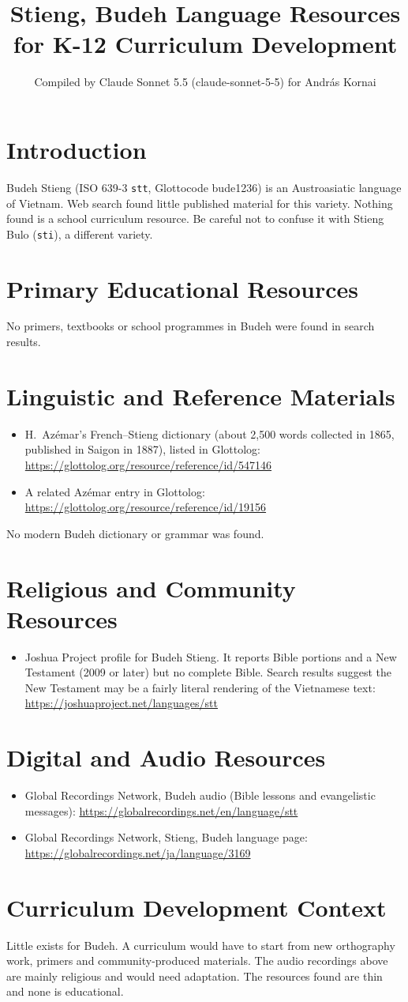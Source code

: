 \documentclass[12pt]{article}
\title{Stieng, Budeh Language Resources for K-12 Curriculum Development}
\author{Compiled by Claude Sonnet 5.5 (claude-sonnet-5-5) for Andr\'as Kornai}
\date{}
\begin{document}
\maketitle

\section{Introduction}
Budeh Stieng (ISO 639-3 \texttt{stt}, Glottocode bude1236) is an Austroasiatic language of Vietnam. Web search found little published material for this variety. Nothing found is a school curriculum resource. Be careful not to confuse it with Stieng Bulo (\texttt{sti}), a different variety.

\section{Primary Educational Resources}
No primers, textbooks or school programmes in Budeh were found in search results.

\section{Linguistic and Reference Materials}
\begin{itemize}
\item H.\ Azémar's French--Stieng dictionary (about 2,500 words collected in 1865, published in Saigon in 1887), listed in Glottolog: \url{https://glottolog.org/resource/reference/id/547146}
\item A related Azémar entry in Glottolog: \url{https://glottolog.org/resource/reference/id/19156}
\end{itemize}
No modern Budeh dictionary or grammar was found.

\section{Religious and Community Resources}
\begin{itemize}
\item Joshua Project profile for Budeh Stieng. It reports Bible portions and a New Testament (2009 or later) but no complete Bible. Search results suggest the New Testament may be a fairly literal rendering of the Vietnamese text: \url{https://joshuaproject.net/languages/stt}
\end{itemize}

\section{Digital and Audio Resources}
\begin{itemize}
\item Global Recordings Network, Budeh audio (Bible lessons and evangelistic messages): \url{https://globalrecordings.net/en/language/stt}
\item Global Recordings Network, Stieng, Budeh language page: \url{https://globalrecordings.net/ja/language/3169}
\end{itemize}

\section{Curriculum Development Context}
Little exists for Budeh. A curriculum would have to start from new orthography work, primers and community-produced materials. The audio recordings above are mainly religious and would need adaptation. The resources found are thin and none is educational.
\end{document}
